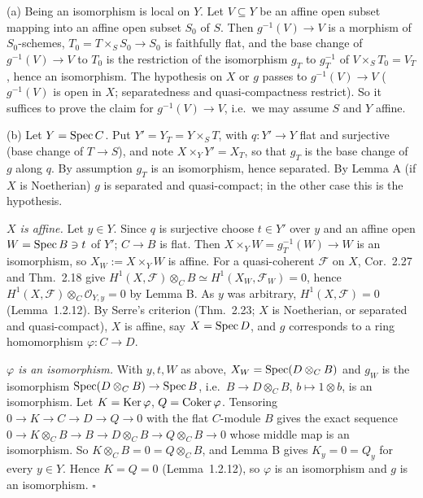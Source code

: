 \documentclass[11pt]{article}
\begin{document}
(a) Being an isomorphism is local on $Y$. Let $V\subseteq Y$ be an affine open subset mapping into an affine open subset $S_0$ of $S$. Then $g^{-1}(V)\to V$ is a morphism of $S_0$-schemes, $T_0=T\times_SS_0\to S_0$ is faithfully flat, and the base change of $g^{-1}(V)\to V$ to $T_0$ is the restriction of the isomorphism $g_T$ to $g_T^{-1}$ of $V\times_ST_0=V_T$, hence an isomorphism. The hypothesis on $X$ or $g$ passes to $g^{-1}(V)\to V$ ($g^{-1}(V)$ is open in $X$; separatedness and quasi-compactness restrict). So it suffices to prove the claim for $g^{-1}(V)\to V$, i.e.\ we may assume $S$ and $Y$ affine.

(b) Let $Y=\operatorname{Spec} C$. Put $Y'=Y_T=Y\times_ST$, with $q:Y'\to Y$ flat and surjective (base change of $T\to S$), and note $X\times_YY'=X_T$, so that $g_T$ is the base change of $g$ along $q$. By assumption $g_T$ is an isomorphism, hence separated. By Lemma A (if $X$ is Noetherian) $g$ is separated and quasi-compact; in the other case this is the hypothesis.

\emph{$X$ is affine.} Let $y\in Y$. Since $q$ is surjective choose $t\in Y'$ over $y$ and an affine open $W=\operatorname{Spec} B\ni t$ of $Y'$; $C\to B$ is flat. Then $X\times_YW=g_T^{-1}(W)\to W$ is an isomorphism, so $X_W:=X\times_YW$ is affine. For a quasi-coherent $\mathcal F$ on $X$, Cor.~2.27 and Thm.~2.18 give $H^1(X,\mathcal F)\otimes_CB\simeq H^1(X_W,\mathcal F_W)=0$, hence $H^1(X,\mathcal F)\otimes_C\mathcal O_{Y,y}=0$ by Lemma B. As $y$ was arbitrary, $H^1(X,\mathcal F)=0$ (Lemma~1.2.12). By Serre's criterion (Thm.~2.23; $X$ is Noetherian, or separated and quasi-compact), $X$ is affine, say $X=\operatorname{Spec} D$, and $g$ corresponds to a ring homomorphism $\varphi:C\to D$.

\emph{$\varphi$ is an isomorphism.} With $y,t,W$ as above, $X_W=\operatorname{Spec}(D\otimes_CB)$ and $g_W$ is the isomorphism $\operatorname{Spec}(D\otimes_CB)\to\operatorname{Spec} B$, i.e.\ $B\to D\otimes_CB$, $b\mapsto1\otimes b$, is an isomorphism. Let $K=\operatorname{Ker}\varphi$, $Q=\operatorname{Coker}\varphi$. Tensoring $0\to K\to C\to D\to Q\to0$ with the flat $C$-module $B$ gives the exact sequence $0\to K\otimes_CB\to B\to D\otimes_CB\to Q\otimes_CB\to0$ whose middle map is an isomorphism. So $K\otimes_CB=0=Q\otimes_CB$, and Lemma B gives $K_y=0=Q_y$ for every $y\in Y$. Hence $K=Q=0$ (Lemma~1.2.12), so $\varphi$ is an isomorphism and $g$ is an isomorphism. \hfill$\square$
\end{document}
